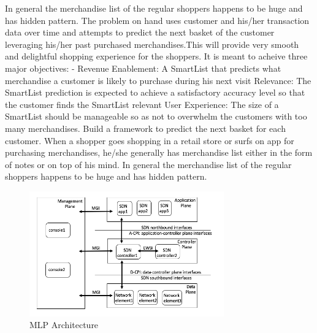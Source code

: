 In general the merchandise list of the regular shoppers happens to be huge and has hidden pattern. 
The problem on hand uses customer and his/her transaction data over time and attempts to predict 
the next basket of the customer leveraging his/her past purchased merchandises.This will provide 
very smooth and delightful shopping experience for the shoppers. It is meant to acheive three major 
objectives: - Revenue Enablement: A SmartList that predicts what merchandise a customer is likely to 
purchase during his next visit Relevance: The SmartList prediction is expected to achieve a 
satisfactory accuracy level so that the customer finds the SmartList relevant User Experience: 
The size of a SmartList should be manageable so as not to overwhelm the customers with too many 
merchandises. Build a framework to predict the next basket for each customer.
When a shopper goes shopping in a retail store or surfs on app for purchasing merchandises, 
he/she generally has merchandise list either in the form of notes or on top of his mind. 
In general the merchandise list of the regular shoppers happens to be huge and has hidden pattern. 

\begin{figure}[t]
  \centering 
  \includegraphics[width=3.3in]{img/MLP.png} 
  \caption{MLP Architecture} 
  \label{fig:MLP} 
\end{figure}

